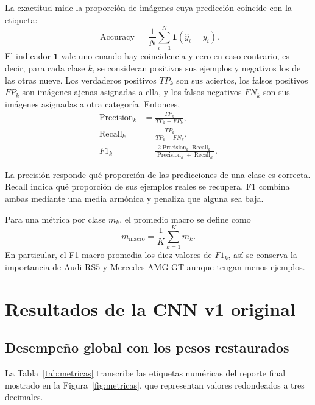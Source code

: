 \documentclass[conference]{IEEEtran}
\begin{document}
La exactitud mide la proporción de imágenes cuya predicción coincide con la etiqueta:
\begin{equation}
\operatorname{Accuracy}=\frac{1}{N}\sum_{i=1}^{N}\mathbf{1}(\widehat{y}_i=y_i).
\label{eq:accuracy}
\end{equation}
El indicador $\mathbf{1}$ vale uno cuando hay coincidencia y cero en caso contrario, es decir, para cada clase $k$, se consideran positivos sus ejemplos y negativos los de las otras nueve. Los verdaderos positivos $TP_k$ son sus aciertos, los falsos positivos $FP_k$ son imágenes ajenas asignadas a ella, y los falsos negativos $FN_k$ son sus imágenes asignadas a otra categoría. Entonces,
\begin{align}
\operatorname{Precision}_k&=\frac{TP_k}{TP_k+FP_k},\label{eq:precision}\\
\operatorname{Recall}_k&=\frac{TP_k}{TP_k+FN_k},\label{eq:recall}\\
F1_k&=\frac{2\operatorname{Precision}_k\operatorname{Recall}_k}
{\operatorname{Precision}_k+\operatorname{Recall}_k}.\label{eq:f1}
\end{align}

La precisión responde qué proporción de las predicciones de una clase es correcta. Recall indica qué proporción de sus ejemplos reales se recupera. F1 combina ambas mediante una media armónica y penaliza que alguna sea baja.

Para una métrica por clase $m_k$, el promedio macro se define como
\begin{equation}
m_{\mathrm{macro}}=\frac{1}{K}\sum_{k=1}^{K}m_k.
\label{eq:macro}
\end{equation}
En particular, el F1 macro promedia los diez valores de $F1_k$, así se conserva la importancia de Audi RS5 y Mercedes AMG GT aunque tengan menos ejemplos.

\FloatBarrier
\section{Resultados de la CNN v1 original}

\subsection{Desempeño global con los pesos restaurados}

La Tabla~\ref{tab:metricas} transcribe las etiquetas numéricas del reporte final mostrado en la Figura~\ref{fig:metricas}, que representan valores redondeados a tres decimales.
\end{document}
